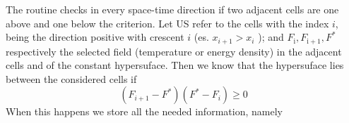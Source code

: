 
The routine checks in every space-time direction if two adjacent cells are one
above and one below the criterion. Let US refer to the cells with the index $i$,
being the direction positive with crescent $i$ (es. $x_{i+1}> x_i$
); and $F_\mathrm{i},F_\mathrm{i+1},F^*$ respectively the selected field
(temperature or energy density) in the adjacent cells and of the constant
hypersuface. Then we know that the hypersuface lies between the considered
cells if 
$$
(F_{i+1}-F^*)(F^*-F_{i})\geq0
$$
When this happens we store all the needed information, namely\\

